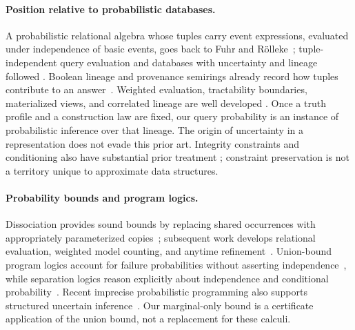 \documentclass[../main.tex]{subfiles}
\begin{document}
\paragraph{Position relative to probabilistic databases.}
A probabilistic relational algebra whose tuples carry event expressions,
evaluated under independence of basic events, goes back to Fuhr and
R{\"o}lleke~\cite{fuhr1997pra}; tuple-independent query evaluation and
databases with uncertainty and lineage followed
\cite{dalvi2007efficient,benjelloun2008uldb}.
Boolean lineage and provenance semirings already record how tuples contribute
to an answer~\cite{green2007provenance}. Weighted evaluation, tractability
boundaries, materialized views, and correlated lineage are well developed
\cite{dalvi2012dichotomy,re2007views,kanagal2010lineage,suciu2011}.
Once a truth profile and a construction law are fixed, our query probability
is an instance of probabilistic inference over that lineage. The origin of
uncertainty in a representation does not evade this prior art. Integrity
constraints and conditioning also have substantial prior treatment
\cite{flesca2013constraints,koch2008conditioning}; constraint preservation
is not a territory unique to approximate data structures.

\paragraph{Probability bounds and program logics.}
Dissociation provides sound bounds by replacing shared occurrences with
appropriately parameterized copies~\cite{gatterbauer2014bounds}; subsequent
work develops relational evaluation, weighted model counting, and anytime
refinement~\cite{gatterbauer2017propagation,chou2018dissociation,vandenheuvel2019scaled}.
Union-bound program logics account for failure probabilities without asserting
independence~\cite{barthe2016union}, while separation logics reason explicitly
about independence and conditional probability~\cite{li2023lilac}.
Recent imprecise probabilistic programming also supports structured uncertain
inference~\cite{liellcock2026imprecise}. Our marginal-only bound is a certificate
application of the union bound, not a replacement for these calculi.
\end{document}
